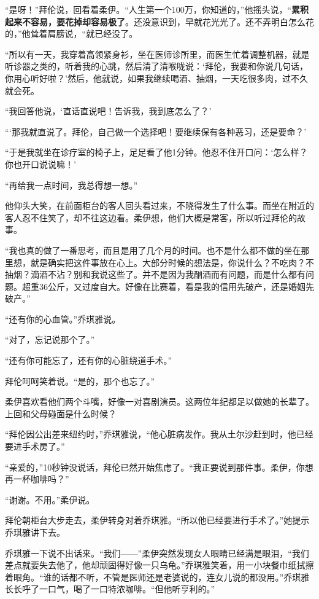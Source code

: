 “是呀！”拜伦说，回看着柔伊。“人生第一个100万，你知道的，”他摇头说，“\textbf{累积起来不容易，要花掉却容易极了}。还没意识到，早就花光光了。还不弄明白怎么花的，”他耸着肩膀说，“就已经没了。

“所以有一天，我穿着高领紧身衫，坐在医师诊所里，而医生忙着调整机器，就是听诊器之类的，听着我的心跳，然后清了清喉咙说：‘拜伦，我要和你说几句话，你用心听好啦？’然后，他就说，如果我继续喝酒、抽烟，一天吃很多肉，过不久就会死。

“我回答他说，‘直话直说吧！告诉我，我到底怎么了？’

“‘那我就直说了。拜伦，自己做一个选择吧！要继续保有各种恶习，还是要命？’

“于是我就坐在诊疗室的椅子上，足足看了他1分钟。他忍不住开口问：‘怎么样？你也开口说说嘛！’

“再给我一点时间，我总得想一想。”

他仰头大笑，在前面柜台的客人回头看过来，不晓得发生了什么事。而坐在附近的客人忍不住笑了，却不往这边看。柔伊想，他们大概是常客，所以听过拜伦的故事。

“我也真的做了一番思考，而且是用了几个月的时间。也不是什么都不做的坐在那里想，就是确实把这件事放在心上。大部分时候的想法是，你说什么？不吃肉？不抽烟？滴酒不沾？别和我说这些了。并不是因为我酗酒而有问题，而是什么都有问题。超重36公斤，又过度自大。好像在比赛着，看是我的信用先破产，还是婚姻先破产。”

“还有你的心血管。”乔琪雅说。

“对了，忘记说那个了。”

“还有你可能忘了，还有你的心脏绕道手术。”

拜伦呵呵笑着说。“是的，那个也忘了。”

柔伊喜欢看他们两个斗嘴，好像一对喜剧演员。这两位年纪都足以做她的长辈了。上回和父母碰面是什么时候？

“拜伦因公出差来纽约时，”乔琪雅说，“他心脏病发作。我从土尔沙赶到时，他已经要进手术房了。”

“亲爱的，”10秒钟没说话，拜伦已然开始焦虑了。“我正要说到那件事。柔伊，你想再一杯咖啡吗？”

“谢谢。不用。”柔伊说。

拜伦朝柜台大步走去，柔伊转身对着乔琪雅。“所以他已经要进行手术了。”她提示乔琪雅讲下去。

乔琪雅一下说不出话来。“我们——”柔伊突然发现女人眼睛已经满是眼泪，“我们差点就要失去他了，他却顽固得好像一只乌龟。”乔琪雅笑着，用一小块餐巾纸拭擦着眼角。“谁的话都不听，不管是医师还是老婆说的，连女儿说的都没用。”乔琪雅长长呼了一口气，喝了一口特浓咖啡。“但他听亨利的。”

